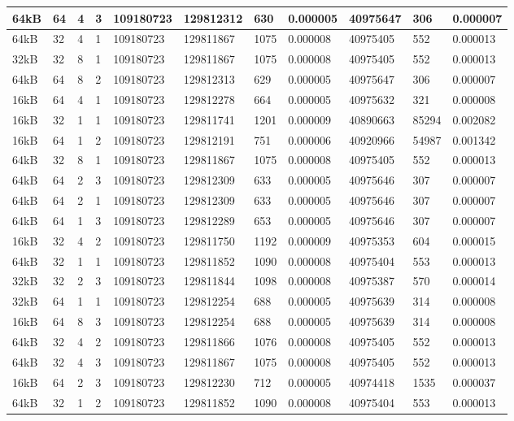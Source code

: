 \documentclass[conference]{IEEEtran}
\begin{document}
\begin{table}
\begin{tabular}{|m{.75cm} |m{.75cm} |m{.8cm} | m{.75cm} | l | l | l | l | l | l | l |}
64kB&	64&	4&	3&	109180723&	129812312&	630	&  0.000005&	40975647	&306	  &0.000007 \\ \hline
64kB&	32&	4&	1&	109180723&	129811867&	1075&	0.000008	&40975405	  &552	  &0.000013 \\ \hline
32kB&	32&	8&	1&	109180723&	129811867&	1075&	0.000008	&40975405	  &552	  &0.000013 \\ \hline
64kB&	64&	8&	2&	109180723&	129812313&	629	&  0.000005&	40975647	&306	  &0.000007 \\ \hline
16kB&	64&	4&	1&	109180723&	129812278&	664	&  0.000005&	40975632	&321	  &0.000008 \\ \hline
16kB&	32&	1&	1&	109180723&	129811741&	1201&	0.000009	&40890663	  &85294	&0.002082 \\ \hline
16kB&	64&	1&	2&	109180723&	129812191&	751	&  0.000006&	40920966	&54987	&0.001342 \\ \hline
64kB&	32&	8&	1&	109180723&	129811867&	1075&	0.000008	&40975405	  &552	  &0.000013 \\ \hline
64kB&	64&	2&	3&	109180723&	129812309&	633	&  0.000005&	40975646	&307	  &0.000007 \\ \hline
64kB&	64&	2&	1&	109180723&	129812309&	633	&  0.000005&	40975646	&307	  &0.000007 \\ \hline
64kB&	64&	1&	3&	109180723&	129812289&	653	&  0.000005&	40975646	&307	  &0.000007 \\ \hline
16kB&	32&	4&	2&	109180723&	129811750&	1192&	0.000009	&40975353	  &604	  &0.000015 \\ \hline
64kB&	32&	1&	1&	109180723&	129811852&	1090&	0.000008	&40975404	  &553	  &0.000013 \\ \hline
32kB&	32&	2&	3&	109180723&	129811844&	1098&	0.000008	&40975387	  &570	  &0.000014 \\ \hline
32kB&	64&	1&	1&	109180723&	129812254&	688	&  0.000005&	40975639	&314	  &0.000008 \\ \hline
16kB&	64&	8&	3&	109180723&	129812254&	688	&  0.000005&	40975639	&314	  &0.000008 \\ \hline
64kB&	32&	4&	2&	109180723&	129811866&	1076&	0.000008	&40975405	  &552	  &0.000013 \\ \hline
64kB&	32&	4&	3&	109180723&	129811867&	1075&	0.000008	&40975405	  &552	  &0.000013 \\ \hline
16kB&	64&	2&	3&	109180723&	129812230&	712	&  0.000005&	40974418&	1535	&0.000037 \\ \hline
64kB&	32&	1&	2&	109180723&	129811852&	1090&	0.000008	&40975404	  &553	  &0.000013 \\ \hline

\end{tabular}
\end{table}
\end{document}
